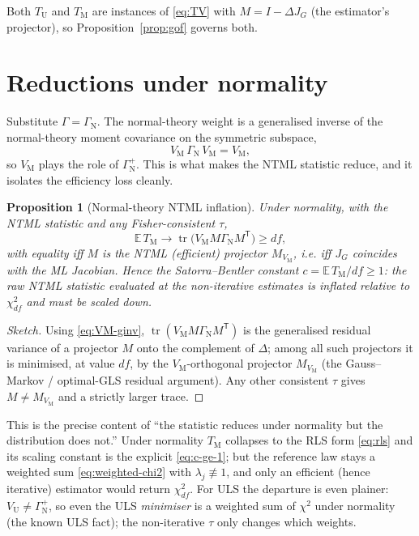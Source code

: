 \documentclass[11pt]{article}
\newcommand{\E}{\mathbb{E}}
\newcommand{\tr}{\operatorname{tr}}
\newcommand{\T}{^{\mathsf T}}
\theoremstyle{plain}
\newtheorem{proposition}{Proposition}
\theoremstyle{definition}
\theoremstyle{remark}
\begin{document}
Both $T_{\mathrm U}$ and $T_{\mathrm M}$ are instances of \eqref{eq:TV} with
$M=I-\Delta J_G$ (the estimator's projector), so Proposition~\ref{prop:gof}
governs both.

\section{Reductions under normality}\label{sec:normal}

Substitute $\Gamma=\Gamma_{\mathrm N}$. The normal-theory weight is a
generalised inverse of the normal-theory moment covariance on the symmetric
subspace,
\begin{equation}\label{eq:VM-ginv}
  V_{\mathrm M}\,\Gamma_{\mathrm N}\,V_{\mathrm M}=V_{\mathrm M},
\end{equation}
so $V_{\mathrm M}$ plays the role of $\Gamma_{\mathrm N}^{+}$. This is what makes
the NTML statistic reduce, and it isolates the efficiency loss cleanly.

\begin{proposition}[Normal-theory NTML inflation]\label{prop:inflation}
Under normality, with the NTML statistic and any Fisher-consistent $\tau$,
\begin{equation}\label{eq:c-ge-1}
  \E\,T_{\mathrm M}\to
  \tr\!\big(V_{\mathrm M}M\Gamma_{\mathrm N}M\T\big)\ge df,
\end{equation}
with equality iff $M$ is the NTML (efficient) projector $M_{V_{\mathrm M}}$, i.e.
iff $J_G$ coincides with the ML Jacobian. Hence the Satorra--Bentler constant
$c=\E\,T_{\mathrm M}/df\ge 1$: the raw NTML statistic evaluated at the
non-iterative estimates is inflated relative to $\chi^2_{df}$ and must be scaled
\emph{down}.
\end{proposition}

\begin{proof}[Sketch]
Using \eqref{eq:VM-ginv}, $\tr(V_{\mathrm M}M\Gamma_{\mathrm N}M\T)$ is the
generalised residual variance of a projector $M$ onto the complement of
$\Delta$; among all such projectors it is minimised, at value $df$, by the
$V_{\mathrm M}$-orthogonal projector $M_{V_{\mathrm M}}$ (the Gauss--Markov /
optimal-GLS residual argument). Any other consistent $\tau$ gives $M\neq
M_{V_{\mathrm M}}$ and a strictly larger trace.
\end{proof}

This is the precise content of ``the statistic reduces under normality but the
distribution does not.'' Under normality $T_{\mathrm M}$ collapses to the RLS
form \eqref{eq:rls} and its scaling constant is the explicit
\eqref{eq:c-ge-1}; but the reference law stays a weighted sum
\eqref{eq:weighted-chi2} with $\lambda_j\not\equiv1$, and only an efficient
(hence iterative) estimator would return $\chi^2_{df}$. For ULS the departure is
even plainer: $V_{\mathrm U}\neq\Gamma_{\mathrm N}^{+}$, so even the ULS
\emph{minimiser} is a weighted sum of $\chi^2$ under normality (the known ULS
fact); the non-iterative $\tau$ only changes which weights.
\end{document}
